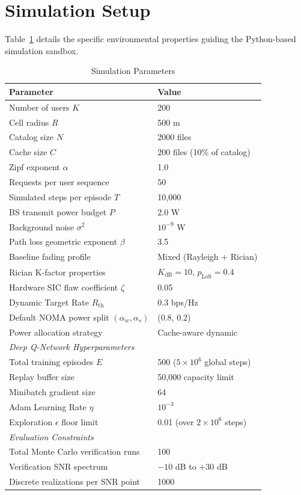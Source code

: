\documentclass[conference]{IEEEtran}
\begin{document}
\section{Simulation Setup}

Table~\ref{tab:params} details the specific environmental properties guiding the Python-based simulation sandbox.

\begin{table}[htbp]
\centering
\caption{Simulation Parameters}
\label{tab:params}
\begin{tabular}{@{}ll@{}}
\toprule
\textbf{Parameter} & \textbf{Value} \\
\midrule
Number of users $K$ & 200 \\
Cell radius $R$ & 500 m \\
Catalog size $N$ & 2000 files \\
Cache size $C$ & 200 files (10\% of catalog) \\
Zipf exponent $\alpha$ & 1.0 \\
Requests per user sequence & 50 \\
Simulated steps per episode $T$ & 10,000 \\
BS transmit power budget $P$ & 2.0 W \\
Background noise $\sigma^2$ & $10^{-9}$ W \\
Path loss geometric exponent $\beta$ & 3.5 \\
Baseline fading profile & Mixed (Rayleigh + Rician) \\
Rician K-factor properties & $K_{\text{dB}} = 10$, $p_{\text{LoS}} = 0.4$ \\
Hardware SIC flaw coefficient $\zeta$ & 0.05 \\
Dynamic Target Rate $R_{\text{th}}$ & 0.3 bps/Hz \\
Default NOMA power split $(\alpha_w, \alpha_s)$ & (0.8, 0.2) \\
Power allocation strategy & Cache-aware dynamic \\
\midrule
\textit{Deep Q-Network Hyperparameters} & \\
Total training episodes $E$ & 500 ($5 \times 10^6$ global steps) \\
Replay buffer size & 50,000 capacity limit \\
Minibatch gradient size & 64 \\
Adam Learning Rate $\eta$ & $10^{-3}$ \\
Exploration $\epsilon$ floor limit & 0.01 (over $2 \times 10^6$ steps) \\
\midrule
\textit{Evaluation Constraints} & \\
Total Monte Carlo verification runs & 100 \\
Verification SNR spectrum & $-10$ dB to $+30$ dB \\
Discrete realizations per SNR point & 1000 \\
\bottomrule
\end{tabular}
\end{table}
\end{document}
